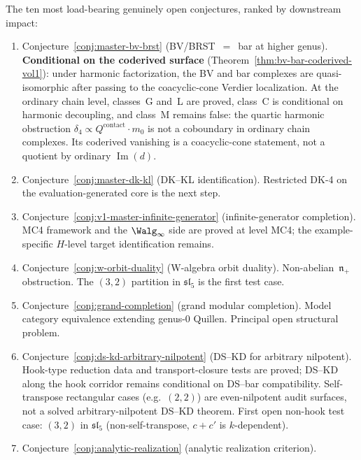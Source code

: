\begin{remark}
\label{rem:concordance-frontier-status-2026}
The ten most load-bearing genuinely open conjectures, ranked by downstream impact:
\begin{enumerate}
\item \textup{Conjecture~\ref{conj:master-bv-brst} (BV/BRST~$=$~bar at higher genus).}
 \textbf{Conditional on the coderived surface}
 (Theorem~\ref{thm:bv-bar-coderived-vol1}): under harmonic
 factorization, the BV and bar complexes are quasi-isomorphic after
 passing to the coacyclic-cone Verdier localization. At the ordinary
 chain level, classes~G and~L are
 proved, class~C is conditional on harmonic decoupling, and class~M
 remains false: the quartic harmonic obstruction
 $\delta_4 \propto Q^{\mathrm{contact}} \cdot m_0$ is not a
 coboundary in ordinary chain complexes. Its coderived vanishing is a
 coacyclic-cone statement, not a quotient by ordinary
 $\operatorname{Im}(d)$.
\item \textup{Conjecture~\ref{conj:master-dk-kl} (DK--KL identification).}
 Restricted DK-4 on the evaluation-generated core is the next step.
\item \textup{Conjecture~\ref{conj:v1-master-infinite-generator} (infinite-generator completion).}
 MC4 framework and the $\Walg_\infty$ side are proved at level MC4; the example-specific $H$-level target identification remains.
\item \textup{Conjecture~\ref{conj:w-orbit-duality} (W-algebra orbit duality).}
 Non-abelian~$\mathfrak{n}_+$ obstruction. The $(3,2)$ partition in $\mathfrak{sl}_5$ is the first test case.
\item \textup{Conjecture~\ref{conj:grand-completion} (grand modular completion).}
 Model category equivalence extending genus-$0$ Quillen. Principal open structural problem.
\item \textup{Conjecture~\ref{conj:ds-kd-arbitrary-nilpotent} (DS--KD for arbitrary nilpotent).}
 Hook-type reduction data and transport-closure tests are proved;
 DS--KD along the hook corridor remains conditional on DS--bar
 compatibility. Self-transpose rectangular cases (e.g.\ $(2,2)$)
 are even-nilpotent audit surfaces, not a solved arbitrary-nilpotent
 DS--KD theorem. First open non-hook test case: $(3,2)$ in
 $\mathfrak{sl}_5$ (non-self-transpose, $c+c'$ is $k$-dependent).
\item \textup{Conjecture~\ref{conj:analytic-realization} (analytic realization criterion).}

\end{enumerate}
\end{remark}
